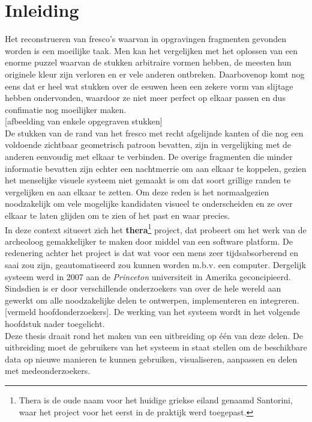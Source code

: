 \chapter{Inleiding}
\label{inleiding}
Het reconstrueren van fresco's waarvan in opgravingen fragmenten gevonden worden
is een moeilijke taak. Men kan het vergelijken met het oplossen van een enorme
puzzel waarvan de stukken arbitraire vormen hebben, de meesten hun originele
kleur zijn verloren en er vele anderen ontbreken. Daarbovenop komt nog eens dat
er heel wat stukken over de eeuwen heen een zekere vorm van slijtage hebben
ondervonden, waardoor ze niet meer perfect op elkaar passen en dus confimatie nog moeilijker maken.\\

[afbeelding van enkele opgegraven stukken]\\

De stukken van de rand van het fresco met recht afgelijnde kanten of die nog een voldoende zichtbaar geometrisch patroon bevatten, zijn in vergelijking met de
anderen eenvoudig met elkaar te verbinden. De overige fragmenten die minder informatie bevatten zijn echter een nachtmerrie om aan elkaar te koppelen, gezien het menselijke visuele systeem niet
gemaakt is om dat soort grillige randen te vergelijken en aan elkaar te zetten. Om deze reden is het normaalgezien noodzakelijk om vele mogelijke kandidaten visueel
te onderscheiden en ze over elkaar te laten glijden om te zien of het past en waar precies.\\

In deze context situeert zich het \textbf{thera}\footnote{Thera is de oude naam voor het huidige griekse eiland genaamd Santorini, waar het project voor het eerst in de praktijk werd toegepast.} project, dat probeert om het werk van de archeoloog gemakkelijker te maken door middel van een software platform. De
redenering achter het project is dat wat voor een mens zeer tijdsabsorberend en saai zou zijn, geautomatiseerd zou kunnen worden m.b.v. een computer. Dergelijk systeem werd
in 2007 aan de \emph{Princeton} universiteit in Amerika geconcipieerd. Sindsdien is er door verschillende onderzoekers van over de hele wereld aan gewerkt om
alle noodzakelijke delen te ontwerpen, implementeren en integreren. [vermeld hoofdonderzoekers]. De werking van het systeem wordt in het 
volgende hoofdstuk nader toegelicht.\\

Deze thesis draait rond het maken van een uitbreiding op \'{e}\'{e}n van deze
delen. De uitbreiding moet de gebruikers van het systeem in staat stellen om de
beschikbare data op nieuwe manieren te kunnen gebruiken, visualiseren, aanpassen
en delen met medeonderzoekers.\\

